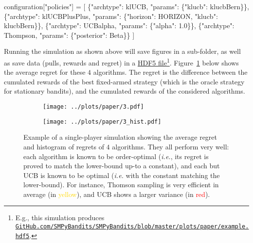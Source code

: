 \documentclass[a4paper,10pt,]{article}
\newenvironment{Shaded}{}{}
\newcommand{\DecValTok}[1]{\textcolor[rgb]{0.25,0.63,0.44}{#1}}
\newcommand{\NormalTok}[1]{#1}
\newcommand{\OperatorTok}[1]{\textcolor[rgb]{0.40,0.40,0.40}{#1}}
\newcommand{\StringTok}[1]{\textcolor[rgb]{0.25,0.44,0.63}{#1}}
\begin{document}
\begin{Shaded}
\begin{Highlighting}[]
\NormalTok{configuration[}\StringTok{"policies"}\NormalTok{] }\OperatorTok{=}\NormalTok{ [}
\NormalTok{  \{}\StringTok{"archtype"}\NormalTok{: klUCB, }\StringTok{"params"}\NormalTok{: \{}\StringTok{"klucb"}\NormalTok{: klucbBern\}\},}
\NormalTok{  \{}\StringTok{"archtype"}\NormalTok{: klUCBPlusPlus, }\StringTok{"params"}\NormalTok{: \{}\StringTok{"horizon"}\NormalTok{: HORIZON, }\StringTok{"klucb"}\NormalTok{: klucbBern\}\},}
\NormalTok{  \{}\StringTok{"archtype"}\NormalTok{: UCBalpha, }\StringTok{"params"}\NormalTok{: \{}\StringTok{"alpha"}\NormalTok{: }\DecValTok{1.0}\NormalTok{\}\},}
\NormalTok{  \{}\StringTok{"archtype"}\NormalTok{: Thompson, }\StringTok{"params"}\NormalTok{: \{}\StringTok{"posterior"}\NormalTok{: Beta\}\}}
\NormalTok{]}
\end{Highlighting}
\end{Shaded}

Running the simulation as shown above will save figures in a sub-folder,
as well as save data (pulls, rewards and regret) in a \href{http://docs.h5py.org/en/stable/high/file.html}{HDF5 file}\footnote{E.g., this simulation produces \href{https://GitHub.com/SMPyBandits/SMPyBandits/blob/master/plots/paper/example.hdf5}{\texttt{GitHub.com/SMPyBandits/SMPyBandits/blob/master/plots/paper/example.hdf5}}.}.
Figure~\ref{fig:plot1} below shows the average regret for these \(4\)
algorithms. The regret is the difference between the cumulated rewards
of the best fixed-armed strategy (which is the oracle strategy for
stationary bandits), and the cumulated rewards of the considered
algorithms.

\begin{figure}
\centering
\begin{subfigure}[b]{0.49\textwidth}
  \texttt{[image: ../plots/paper/3.pdf]}
\end{subfigure}
\begin{subfigure}[b]{0.49\textwidth}
  \texttt{[image: ../plots/paper/3\_hist.pdf]}
\end{subfigure}
\caption{Example of a single-player simulation showing the average regret and histogram of regrets of
\(4\) algorithms. They all perform very well: each algorithm is known to
be order-optimal (\emph{i.e.}, its regret is proved to match the
lower-bound up-to a constant), and each but UCB is known to be optimal
(\emph{i.e.} with the constant matching the
lower-bound). For instance, Thomson sampling is very efficient in average (in \textcolor{gold}{yellow}), and UCB shows a larger variance (in \textcolor{red}{red}).\label{fig:plot1}}
\end{figure}
\end{document}
